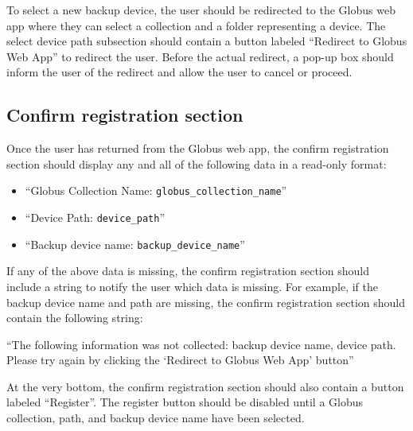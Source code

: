 \noindent To select a new backup device, the user should be redirected to the
Globus web app where they can select a collection and a folder representing a device. 
The select device path subsection should contain a button labeled ``Redirect to Globus Web App'' 
to redirect the user. Before the actual redirect, a pop-up box 
should inform the user of the redirect and allow the user to cancel or proceed. 
\subsection{Confirm registration section}

Once the user has returned from the Globus web app, the confirm registration section should 
display any and all of the following data in a read-only format:

\begin{itemize}\itemsep1pt
    \item ``Globus Collection Name: \texttt{globus\_collection\_name}''
    \item ``Device Path: \texttt{device\_path}''
    \item ``Backup device name: \texttt{backup\_device\_name}''
\end{itemize}

\noindent If any of the above data is missing, the confirm registration section should
include a string to notify the user which data is missing. For example, if the backup device
name and path are missing, the confirm registration section should contain the following string:

\vspace{3mm}
``The following information was not collected: backup device name, device path. Please try 
again by clicking the `Redirect to Globus Web App' button''
\vspace{3mm}

\noindent At the very bottom, the confirm registration section should also contain a button 
labeled ``Register''. The register button should be disabled until a Globus collection, path, 
and backup device name have been selected.

